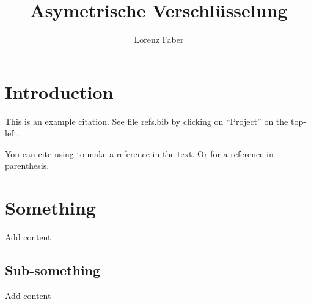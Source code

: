 \documentclass[a4paper, 12pt, one column]{article}
\title{Asymetrische Verschlüsselung}
\author{Lorenz Faber}
\begin{document}
	\maketitle
	
	
	\section{Introduction}
	
	This is an example citation. See file refs.bib by clicking on ``Project'' on the top-left. 
	
	You can cite using \citet{Claydon17} to make a reference in the text. Or \citep{Claydon17} for a reference in parenthesis. 
	
	\section{Something}
	
	Add content
	
	\subsection{Sub-something}
	
	Add content
	
	
\end{document}
